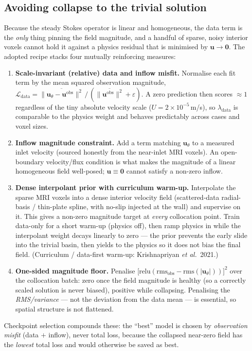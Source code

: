 \documentclass[11pt]{article}
\begin{document}
\subsection*{Avoiding collapse to the trivial solution}
Because the steady Stokes operator is linear and homogeneous, the data term is the \emph{only} thing pinning the field magnitude, and a handful of sparse, noisy interior voxels cannot hold it against a physics residual that is minimised by $\mathbf{u}\to\mathbf{0}$. The adopted recipe stacks four mutually reinforcing measures:
\begin{enumerate}[noitemsep]
\item \textbf{Scale-invariant (relative) data and inflow misfit.} Normalise each fit term by the mean squared observation magnitude, $\mathcal{L}_{\text{data}} = \overline{\|\mathbf{u}_\theta-\mathbf{u}^{\text{obs}}\|^2}\,/\,(\overline{\|\mathbf{u}^{\text{obs}}\|^2}+\varepsilon)$. A zero prediction then scores $\approx1$ regardless of the tiny absolute velocity scale ($U=2\times10^{-5}$\,m/s), so $\lambda_{\text{data}}$ is comparable to the physics weight and behaves predictably across cases and voxel sizes.
\item \textbf{Inflow magnitude constraint.} Add a term matching $\mathbf{u}_\theta$ to a measured inlet velocity (sourced honestly from the near-inlet MRI voxels). An open-boundary velocity/flux condition is what makes the magnitude of a linear homogeneous field well-posed; $\mathbf{u}\equiv\mathbf{0}$ cannot satisfy a non-zero inflow.
\item \textbf{Dense interpolant prior with curriculum warm-up.} Interpolate the sparse MRI voxels into a dense interior velocity field (scattered-data radial-basis / thin-plate spline, with no-slip injected at the wall) and supervise on it. This gives a non-zero magnitude target at \emph{every} collocation point. Train data-only for a short warm-up (physics off), then ramp physics in while the interpolant weight decays linearly to zero --- the prior prevents the early slide into the trivial basin, then yields to the physics so it does not bias the final field. (Curriculum / data-first warm-up: Krishnapriyan \emph{et al.}\ 2021.)
\item \textbf{One-sided magnitude floor.} Penalise $\big[\mathrm{relu}(\text{rms}_{\text{obs}} - \text{rms}(|\mathbf{u}_\theta|))\big]^2$ over the collocation batch: zero once the field magnitude is healthy (so a correctly scaled solution is never biased), positive while collapsing. Penalising the \emph{RMS/variance} --- not the deviation from the data mean --- is essential, so spatial structure is not flattened.
\end{enumerate}
Checkpoint selection compounds these: the ``best'' model is chosen by \emph{observation misfit} (data $+$ inflow), never total loss, because the collapsed near-zero field has the \emph{lowest} total loss and would otherwise be saved as best.
\end{document}
